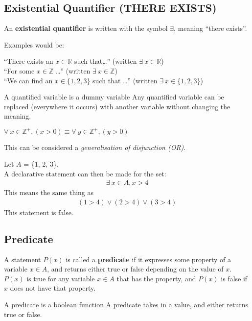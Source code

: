 \documentclass[../notes.tex]{subfiles}
\begin{document}
			\subsection[Existential Quantifier]{Existential Quantifier (THERE EXISTS)}
				An \textbf{existential quantifier} is written with the symbol $\exists $, meaning ``there exists''.
				\begin{example}
					Examples would be:
					\begin{indentparagraph}
						``There exists an $x \in \mathbb{R}$ such that\ldots'' (written $\exists \: x \in \mathbb{R}$)\\
						``For some $x \in \mathbb{Z}$ \ldots'' (written $\exists \: x \in \mathbb{Z}$)\\
						``We can find an $x \in \{1, 2, 3\}$ such that \ldots'' (written $\exists \: x \in \{1, 2, 3\}$)
					\end{indentparagraph}
				\end{example}
				\begin{sidenote}{A quantified variable is a dummy variable}
					Any quantified variable can be replaced (everywhere it occurs) with another variable without changing the meaning.
					\begin{example}
						$\forall \: x \in \mathbb{Z}^{+}, (x > 0) \equiv \forall \: y \in \mathbb{Z}^{+}, (y > 0)$
					\end{example}
				\end{sidenote}
				This can be considered a \textit{generalisation of disjunction (OR)}.
				\begin{example}
					Let $A$ = \{1, 2, 3\}.\\
					A declarative statement can then be made for the set:
					\begin{align*}
						\exists \: x \in A, x > 4
					\end{align*}
					This means the same thing as 
					\begin{align*}
						(1 > 4) \lor (2 > 4) \lor (3 > 4)
					\end{align*}
					This statement is false.
				\end{example}
			\subsection{Predicate}
				A statement $P(x)$ is called a \textbf{predicate} if it expresses some property of a variable $x \in A$, and returns either true or false depending on the value of $x$. $P(x)$ is true for any variable $x \in A$ that has the property, and $P(x)$ is false if $x$ does not have that property.
				\begin{sidenote}{A predicate is a boolean function}
					A predicate takes in a value, and either returns true or false.
				\end{sidenote}
\end{document}
